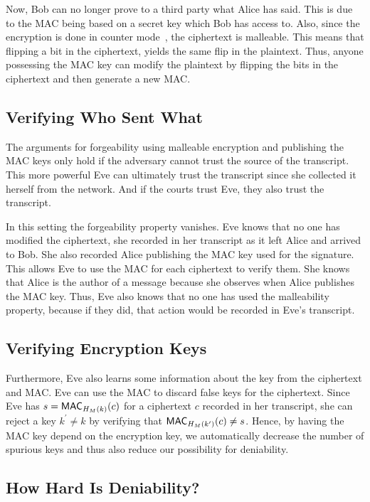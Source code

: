 Now, Bob can no longer prove to a third party what Alice has said.
This is due to the \ac{MAC} being based on a secret key which Bob has access 
to.
Also, since the encryption is done in counter mode~\cite{blockmodes}, the 
ciphertext is malleable.
This means that flipping a bit in the ciphertext, yields the same flip in the 
plaintext.
Thus, anyone possessing the \ac{MAC} key can modify the plaintext by flipping 
the bits in the ciphertext and then generate a new \ac{MAC}.

\subsection{Verifying Who Sent What}

The arguments for forgeability using malleable encryption and publishing the 
\ac{MAC} keys only hold if the adversary cannot trust the source of the 
transcript.
This more powerful Eve can ultimately trust the transcript since she collected 
it herself from the network.
And if the courts trust Eve, they also trust the transcript.

In this setting the forgeability property vanishes.
Eve knows that no one has modified the ciphertext, she recorded in her 
transcript as it left Alice and arrived to Bob.
She also recorded Alice publishing the \ac{MAC} key used for the signature.
This allows Eve to use the \ac{MAC} for each ciphertext to verify them.
She knows that Alice is the author of a message because she observes when Alice 
publishes the \ac{MAC} key.
Thus, Eve also knows that no one has used the malleability property, because if 
they did, that action would be recorded in Eve's transcript.

\subsection{Verifying Encryption Keys}

Furthermore, Eve also learns some information about the key from the ciphertext 
and \ac{MAC}.
Eve can use the \ac{MAC} to discard false keys for the ciphertext.
Since Eve has \(s = \operatorname{\mathsf{MAC}}_{H_M( k )}( c )\) for a ciphertext \(c\) recorded in 
her transcript, she can reject a key \(k^\prime\neq k\) by verifying that
\(\operatorname{\mathsf{MAC}}_{H_M( k^\prime )}( c ) \neq s\).
Hence, by having the \ac{MAC} key depend on the encryption key, we 
automatically decrease the number of spurious keys and thus also reduce our 
possibility for deniability.

\subsection{How Hard Is Deniability?}
\label{sec:HardnessOfDeniability}

